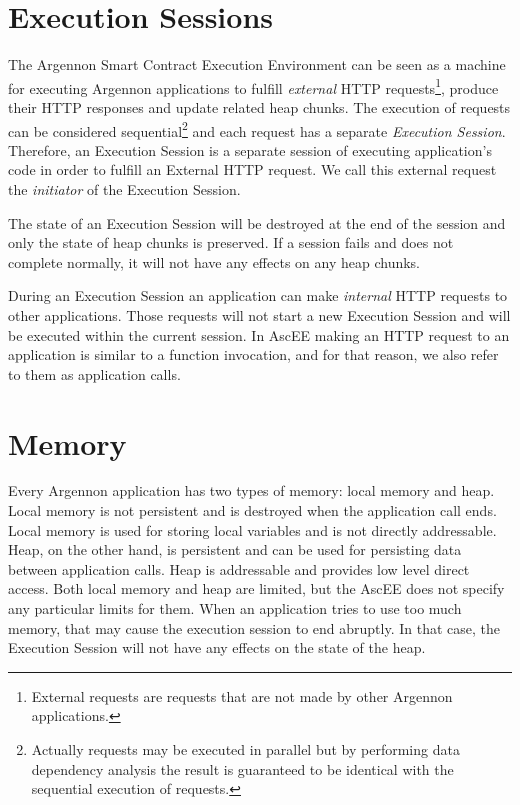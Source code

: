 \section{Execution Sessions}\label{sec:sessions}

The Argennon Smart Contract Execution Environment can be seen as a machine for executing Argennon applications to
fulfill \emph{external} HTTP requests\footnote{External requests are requests that are not made by other Argennon
applications.}, produce their HTTP responses and update related heap chunks. The execution of requests can be
considered sequential\footnote{Actually requests may be executed in parallel but by performing data dependency analysis
the result is guaranteed to be identical with the sequential execution of requests.} and each request has a separate
\emph{Execution Session}. Therefore, an Execution Session is a separate session of executing application's code in
order to fulfill an External HTTP request. We call this external request the \emph{initiator} of the Execution Session.


The state of an Execution Session will be
destroyed at the end of the session and only the state of heap chunks is preserved. If a session fails and does not
complete normally, it will not have any effects on any heap chunks.

During an Execution Session an application can make \emph{internal} HTTP requests to other applications. Those
requests will not start a new Execution Session and will be executed within the current session. In AscEE making an
HTTP request to an application is similar to a function invocation, and for that reason, we also refer to them as
application calls.


\section{Memory}\label{mem}

Every Argennon application has two types of memory: local memory and heap. Local memory is not persistent and is
destroyed when the application call ends. Local memory is used for storing local variables and is not directly
addressable. Heap, on the other hand, is persistent and can be used for persisting data between application calls.
Heap is addressable and provides low level direct access. Both local memory and heap are limited, but the
AscEE does not specify any particular limits for them. When an application tries to use too much memory, that may
cause the execution session to end abruptly. In that case, the Execution Session will not have any effects on the
state of the heap.


